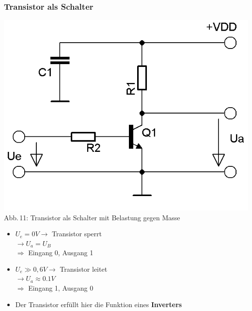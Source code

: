 \begin{frame}
	\frametitle{Transistor als Schalter}
	\begin{minipage}{0.4\textwidth}
	\begin{center}
			\includegraphics[width=\textwidth,height=.85\textheight,keepaspectratio]{a06/Transistor-Schalter.png}\\
			{\tiny Abb.\,11: Transistor als Schalter mit Belastung gegen Masse~\cite{bnetza}}
		\end{center}
	      \end{minipage}
	      \hspace{3mm}
	      \begin{minipage}{0.5\textwidth}
		\begin{itemize}
			\item $U_e = 0 V \rightarrow$ Transistor sperrt\\ $\rightarrow U_a = U_B$\\ $\Rightarrow$ Eingang 0, Ausgang 1
			\item $U_e \gg 0,6 V \rightarrow$ Transistor leitet\\ $\rightarrow U_a \approx 0.1 V$\\ $\Rightarrow$ Eingang 1, Ausgang 0
			\item Der Transistor erfüllt hier die Funktion eines \textbf{Inverters}
		\end{itemize}
	      \end{minipage}
\end{frame}

